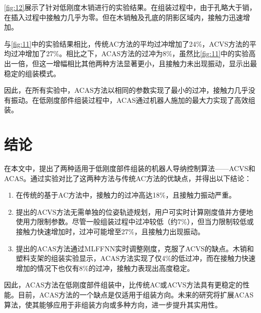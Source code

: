 \documentclass{Diploma}
\begin{document}
\ref{fig:12}展示了针对低刚度木销进行的实验结果。在组装过程中，由于孔略大于销，在插入过程中接触力几乎为零。但在木销触及孔底的阴影区域内，接触力迅速增加。

%

与\ref{fig:11}中的实验结果相比，传统AC方法的平均过冲增加了24\%，ACVS方法的平均过冲增加了27\%。相比之下，ACAS方法的过冲为8\%，虽然比\ref{fig:11}中的实验高出一倍，但这一增幅相比其他两种方法显著更小，且接触力未出现振动，显示出最稳定的组装模式。

因此，在所有实验中，ACAS方法以相同的参数实现了最小的过冲，接触力几乎没有振动。在低刚度部件组装过程中，ACAS通过机器人施加的最大力实现了高效组装。

\section{结论}

在本文中，提出了两种适用于低刚度部件组装的机器人导纳控制算法——ACVS和ACAS。通过实验对比了这两种方法与传统AC方法的优缺点，并得出以下结论：

\begin{enumerate}
  \item 在传统的基于AC方法中，接触力的过冲高达18\%，且接触力振动严重。
  \item 提出的ACVS方法无需单独的位姿轨迹规划，用户可实时计算刚度值并方便地使用力限制参数。尽管一般组装过程中过冲较低（约7\%），但当力限制较低或接触力快速增加时，过冲可能增至27\%，且接触力出现振动。
  \item 提出的ACAS方法通过MLFFNN实时调整刚度，克服了ACVS的缺点。木销和塑料支架的组装实验显示，ACAS方法实现了仅4\%的低过冲，而在接触力快速增加的情况下也仅有8\%的过冲，接触力表现出高度稳定。
\end{enumerate}

因此，ACAS方法在低刚度部件组装中，比传统AC或ACVS方法具有更稳定的性能。目前，ACAS方法的一个缺点是仅适用于组装方向。未来的研究将扩展ACAS算法，使其能够应用于非组装方向或多种方向，进一步提升其实用性。
\end{document}
